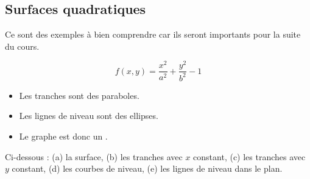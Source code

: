 \documentclass[11pt,class=report,crop=false]{standalone}
\begin{document}
\subsection{Surfaces quadratiques}

Ce sont des exemples à bien comprendre car ils seront importants pour la suite du cours.

\begin{exemple}
$$f(x,y) = \frac{x^2}{a^2} + \frac{y^2}{b^2}-1$$



\begin{itemize}
  \item Les tranches sont des paraboles.
  \item Les lignes de niveau sont des ellipses.
  \item Le graphe est donc un .
\end{itemize}

Ci-dessous : (a) la surface, (b) les tranches avec $x$ constant, (c) les tranches avec $y$ constant, (d) les courbes de niveau, (e) les lignes de niveau dans le plan.


\end{exemple}
\end{document}

